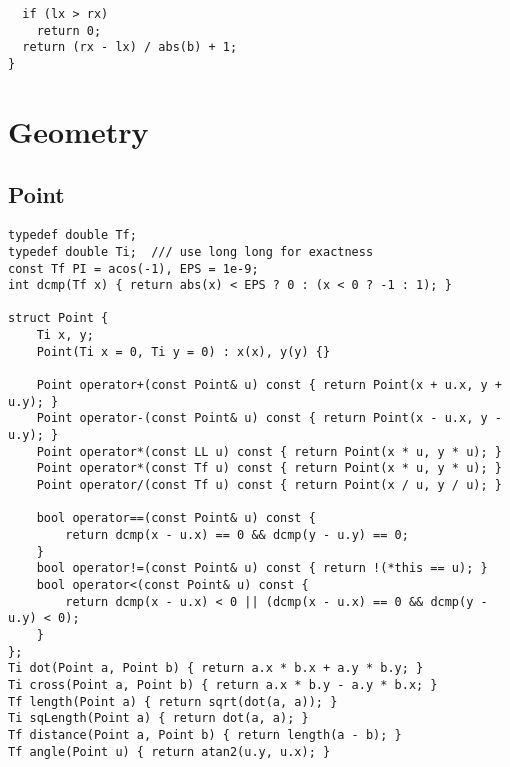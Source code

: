 \documentclass[FSZ,a4paper,onesided]{article}
\begin{document}
\begin{multicols*}{\COLS}
\begin{lstlisting}
  if (lx > rx)
    return 0;
  return (rx - lx) / abs(b) + 1;
}\end{lstlisting}
\section{Geometry}
\subsection{Point}
\begin{lstlisting}
typedef double Tf;
typedef double Ti;  /// use long long for exactness
const Tf PI = acos(-1), EPS = 1e-9;
int dcmp(Tf x) { return abs(x) < EPS ? 0 : (x < 0 ? -1 : 1); }

struct Point {
    Ti x, y;
    Point(Ti x = 0, Ti y = 0) : x(x), y(y) {}

    Point operator+(const Point& u) const { return Point(x + u.x, y + u.y); }
    Point operator-(const Point& u) const { return Point(x - u.x, y - u.y); }
    Point operator*(const LL u) const { return Point(x * u, y * u); }
    Point operator*(const Tf u) const { return Point(x * u, y * u); }
    Point operator/(const Tf u) const { return Point(x / u, y / u); }

    bool operator==(const Point& u) const {
        return dcmp(x - u.x) == 0 && dcmp(y - u.y) == 0;
    }
    bool operator!=(const Point& u) const { return !(*this == u); }
    bool operator<(const Point& u) const {
        return dcmp(x - u.x) < 0 || (dcmp(x - u.x) == 0 && dcmp(y - u.y) < 0);
    }
};
Ti dot(Point a, Point b) { return a.x * b.x + a.y * b.y; }
Ti cross(Point a, Point b) { return a.x * b.y - a.y * b.x; }
Tf length(Point a) { return sqrt(dot(a, a)); }
Ti sqLength(Point a) { return dot(a, a); }
Tf distance(Point a, Point b) { return length(a - b); }
Tf angle(Point u) { return atan2(u.y, u.x); }


\end{lstlisting}
\end{multicols*}
\end{document}
